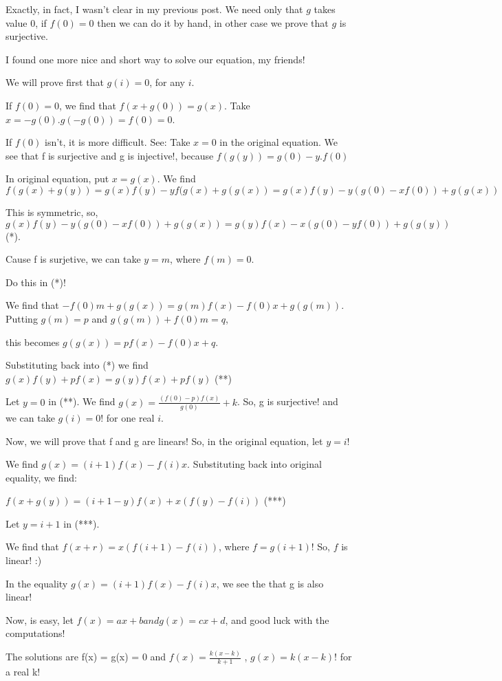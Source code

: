 \begin{mysolution}
	Exactly, in fact, I wasn't clear in my previous post. We need only that $g$ takes value $0$, if $f(0)=0$ then we can do it by hand, in other case we prove that $g$ is surjective.
\end{mysolution}



\begin{mysolution}
	I found one more nice and short way to solve our equation, my friends!

We will prove first that $g(i) = 0$, for any $i$.

If $f(0) = 0$, we find that $f(x+g(0)) = g(x)$. Take $x =-g(0). g(-g(0)) = f(0) = 0$.

If $f(0)$ isn't, it is more difficult. See:
Take $x = 0$ in the original equation. We see that f is surjective and g is injective!, because $f(g(y)) = g(0)-y.f(0)$

In original equation, put $x = g(x)$. We find $f(g(x)+g(y)) = g(x)f(y)-yf(g(x)+g(g(x))=g(x)f(y)-y(g(0)-xf(0))+g(g(x))$

This is symmetric, so, $g(x)f(y)-y(g(0)-xf(0))+g(g(x)) = g(y)f(x)-x(g(0)-yf(0))+g(g(y))$ (*).

Cause f is surjetive, we can take $y = m$, where $f(m) = 0$.

Do this in (*)!

We find that $-f(0)m+g( g(x) ) = g(m) f(x)-f(0)x+g(g(m))$. Putting $g(m) = p$ and $g(g(m))+f(0)m = q$,

this becomes $g(g(x)) = pf(x)-f(0)x+q$.

Substituting back into (*) we find  $g(x) f(y)+pf(x) = g(y)f(x)+pf(y)$ (**)

Let $y = 0$ in (**). We find $g(x) = \frac{(f(0)-p)f(x)}{g(0)}+k$. So, g is surjective! and we can take $g(i) = 0!$ for one real $i$.

Now, we will prove that f and g are linears!
So, in the original equation, let $y = i$!

We find $g(x) = (i+1)f(x)-f(i)x$. Substituting back into original equality, we find:

$f(x+g(y)) = (i+1-y)f(x)+x(f(y)-f(i))$ (***)

Let $y = i+1$ in (***).

We find that $f(x+r) = x(f(i+1)-f(i))$, where $f = g(i+1)$! So, $f$ is linear!  :) 

In the equality $g(x) = (i+1)f(x)-f(i)x$, we see the that g is also linear!


Now, is easy, let $f(x) = ax+b and g(x) = cx+d$, and good luck with the computations!

The solutions are f(x) = g(x) = 0 and $f(x) = \frac{k(x-k)}{k+1}$ , $g(x) ={k(x-k)}$! for a real k!
\end{mysolution}



